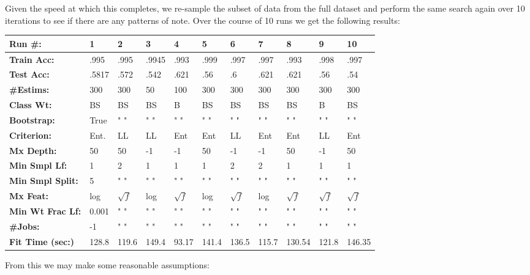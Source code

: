 \documentclass[titlepage]{article}
\begin{document}
Given the speed at which this completes, we re-sample the subset of data from the full dataset and perform the same search again over 10 iterations to see if there are any patterns of note.  Over the course of 10 runs we get the following results:  
\vspace{.2cm}\newline
	\begin{tabular}{ l | l | l | l | l | l | l | l | l | l | l }
	\textbf{Run \#:} & 1 & 2 & 3 & 4 & 5 & 6 & 7  & 8 & 9 & 10\\		
	\hline
	\textbf{Train Acc:} & .995 & .995 & .9945 & .993 & .999 & .997 & .997 & .993 & .998 & .997 \\
	\textbf{Test Acc:} & .5817 & .572 & .542 & .621 &  .56 & .6 & .621 & .621 & .56  & .54 \\
	\textbf{\#Estims:} &  300 & 300  & 50 & 100 & 300 & 300 & 300 &  300 & 300 & 300 \\  
	\textbf{Class Wt:} & BS  & BS &  BS & B & BS & BS & BS &  BS &  B &  BS \\
	\textbf{Bootstrap:} & True & " " & " " &  " " & " " & " " &  " " & " " & " " & " "  \\
	\textbf{Criterion:}  & Ent.  & LL &  LL  & Ent & Ent  & LL & Ent & Ent & LL & Ent \\
	\textbf{Mx Depth:} & 50 & 50 & -1 & -1 & 50 & -1 & -1  & 50 & -1 & 50 \\
	\textbf{Min Smpl Lf:} & 1 & 2 & 1 & 1 & 1 & 2 & 2 & 1 & 1 & 1 \\
	\textbf{Min Smpl Split:} & 5 & " " & " " & " " & " " &  " " & " " &  " " &  " " & " " \\
	\textbf{Mx Feat:} & log & $\sqrt{f}$ & log & $\sqrt{f}$ & log & $\sqrt{f}$ & log & $\sqrt{f}$ & $\sqrt{f}$ & $\sqrt{f}$ \\
	\textbf{Min Wt Frac Lf:} &  0.001 & " " & " " & " " &  " " & " " & " " & " " & " " & " " \\
	\textbf{\#Jobs:} & -1  & " " & " " & " " & " " & " " & " " & " " & " " & " " \\
	\textbf{Fit Time (sec:)} &  128.8 & 119.6 & 149.4 &  93.17 & 141.4 & 136.5 & 115.7 & 130.54 & 121.8 & 146.35 \\
\end{tabular}
\vspace{.2cm}\newline
From this we may make some reasonable assumptions:
\end{document}
